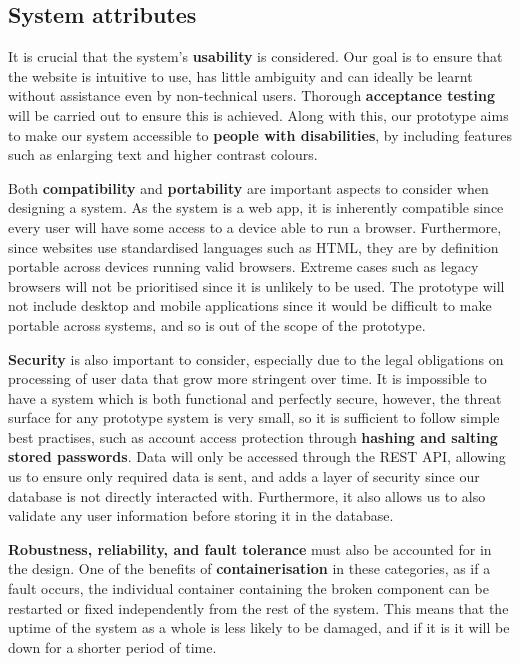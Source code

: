 \documentclass[10pt]{article}
\begin{document}
\subsection{System attributes}
It is crucial that the system's \textbf{usability} is considered. Our goal is to
ensure that the website is intuitive to use, has little ambiguity and can
ideally be learnt without assistance even by non-technical users. Thorough
\textbf{acceptance testing} will be carried out to ensure this is achieved.
Along with this, our prototype aims to make our system accessible to
\textbf{people with disabilities}, by including features such as enlarging text
and higher contrast colours.

Both \textbf{compatibility} and \textbf{portability} are important aspects to
consider when designing a system. As the system is a web app, it is inherently
compatible since every user will have some access to a device able to run a
browser. Furthermore, since websites use standardised languages such as HTML,
they are by definition portable across devices running valid browsers. Extreme
cases such as legacy browsers will not be prioritised since it is unlikely to be
used. The prototype will not include desktop and mobile applications since it
would be difficult to make portable across systems, and so is out of the scope
of the prototype.

\textbf{Security} is also important to consider, especially due to the legal
obligations on processing of user data that grow more stringent over time. It is
impossible to have a system which is both functional and perfectly secure,
however, the threat surface for any prototype system is very small, so it is
sufficient to follow simple best practises, such as account access protection
through \textbf{hashing and salting stored passwords}. Data will only be
accessed through the REST API, allowing us to ensure only required data is sent,
and adds a layer of security since our database is not directly interacted with.
Furthermore, it also allows us to also validate any user information before
storing it in the database.

\textbf{Robustness, reliability, and fault tolerance} must also
be accounted for in the design. One of the benefits of \textbf{containerisation}
in these categories, as if a fault occurs, the individual container containing
the broken component can be restarted or fixed independently from the rest of
the system. This means that the uptime of the system as a whole is less likely
to be damaged, and if it is it will be down for a shorter period of time.
\end{document}
